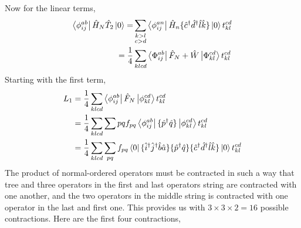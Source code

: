 Now for the linear terms,
\begin{equation}
    \begin{aligned}
         \bra{\phi^{ab}_{ij}} \hat{H}_N \hat{T}_2 \ket{0} 
            = &\sum_{\substack{k>l \\ c>d}} \bra{\phi^{an}_{ij}} \hat{H}_n 
                \{\hat{c}^\dagger \hat{d}^\dagger \hat{l} \hat{k} \} \ket{0}t^{cd}_{kl} \\
            = \frac{1}{4} &\sum_{klcd} \bra{\Phi^{ab}_{ij}} \hat{F}_N + \hat{W}\ket{\Phi^{cd}_{kl}}t^{cd}_{kl}
    \end{aligned}
\end{equation}
Starting with the first term,
\begin{equation}
    \begin{aligned}
         L_1 &= \frac{1}{4}\sum_{klcd} \bra{\phi^{ab}_{ij}} \hat{F}_N \ket{\phi^{cd}_{kl}} t^{cd}_{kl} \\
            &= \frac{1}{4}\sum_{klcd} \sum{pq} f_{pq} \bra{\phi^{ab}_{ij}}
                \{ \hat{p}^\dagger \hat{q}\} \ket{\phi^{cd}_{kl}} t^{cd}_{kl} \\
            &= \frac{1}{4} \sum_{klcd}\sum_{pq} f_{pq} \bra{0}
                \{\hat{i}^\dagger \hat{j}^\dagger \hat{b} \hat{a} \}
                \{\hat{p}^\dagger \hat{q}\} 
                \{\hat{c}^\dagger \hat{d}^\dagger \hat{l} \hat{k} \}
            \ket{0} t^{cd}_{kl}
    \end{aligned}
\end{equation}
The product of normal-ordered operators must be contracted in such a way that tree and
three operators in the first and last operators string are contracted with one another,
and the two operators in the middle string is contracted with one operator in the last
and first one. This provides us with $3\times 3 \times 2 = 16$ possible contractions.
Here are the first four contractions,

